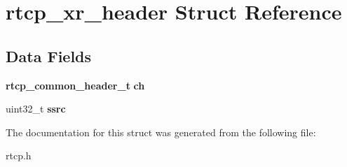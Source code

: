 \section{rtcp\+\_\+xr\+\_\+header Struct Reference}
\label{structrtcp__xr__header}
\subsection*{Data Fields}
\begin{DoxyCompactItemize}
\item 
\mbox{\label{structrtcp__xr__header_adab55e5386ffffef871ef82d40c38c1b}} 
\textbf{ rtcp\+\_\+common\+\_\+header\+\_\+t} {\bfseries ch}
\item 
\mbox{\label{structrtcp__xr__header_a03284be2e3a2d9152aa14053e3f76db4}} 
uint32\+\_\+t {\bfseries ssrc}
\end{DoxyCompactItemize}


The documentation for this struct was generated from the following file\+:\begin{DoxyCompactItemize}
\item 
rtcp.\+h\end{DoxyCompactItemize}
